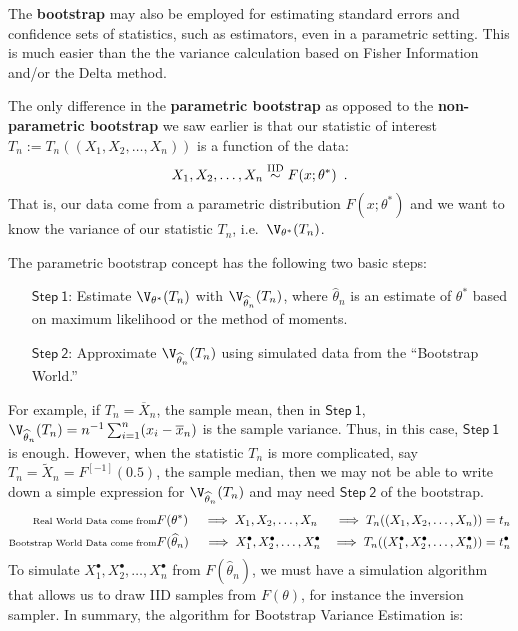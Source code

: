 The {\bf bootstrap} may also be employed for estimating standard errors and confidence sets of statistics, such as estimators, even in a parametric setting.  This is much easier than the the variance calculation based on Fisher Information and/or the Delta method.  

The only difference in the {\bf parametric bootstrap} as opposed to the {\bf non-parametric bootstrap} we saw earlier is that our statistic of interest $T_n := T_n((X_1,X_2,\ldots,X_n))$ is a function of the data: 
$$X_1,X_2,\ldots,X_n \overset{{\rm IID}}{\sim} F(x;\theta^*) \enspace .$$
That is, our data come from a parametric distribution $F(x;\theta^*)$ and we want to know the variance of our statistic $T_n$, i.e.~$\V_{\theta^*}(T_n)$.  

The parametric bootstrap concept has the following two basic steps:
\begin{enumerate}
\item[$\mathsf{Step~1}$:] Estimate $\V_{\theta^*}(T_n)$ with $\V_{\widehat{\theta}_n}(T_n)$, where $\widehat{\theta}_n$ is an estimate of $\theta^*$ based on maximum likelihood or the method of moments.
\item[$\mathsf{Step~2}$:] Approximate $\V_{\widehat{\theta}_n}(T_n)$ using simulated data from the ``Bootstrap World.'' 
\end{enumerate}
For example, if $T_n=\overline{X}_n$, the sample mean, then in $\mathsf{Step~1}$, $\V_{\widehat{\theta}_n}(T_n) = n^{-1} \sum_{i=1}^n (x_i-\overline{x}_n)$ is the sample variance.  Thus, in this case,  $\mathsf{Step~1}$ is enough.  However, when the statistic $T_n$ is more complicated, say $T_n=\widetilde{X}_n = F^{[-1]}(0.5)$, the sample median, then we may not be able to write down a  simple expression for $\V_{\widehat{\theta}_n}(T_n)$ and may need $\mathsf{Step~2}$ of the bootstrap.
\begin{eqnarray}
{\scriptsize \text{Real World Data come from}} &  F(\theta^*) \quad \implies X_1,X_2,\ldots,X_n & \implies 
T_n((X_1,X_2,\ldots,X_n))=t_n \notag \\
{\scriptsize \text{Bootstrap World Data come from}} & F(\widehat{\theta}_n) \quad  \implies X^{\bullet}_1,X^{\bullet}_2,\ldots,X^{\bullet}_n & \implies 
T_n((X^{\bullet}_1,X^{\bullet}_2,\ldots,X^{\bullet}_n))=t^{\bullet}_n \notag
\end{eqnarray}
To simulate $X^{\bullet}_1,X^{\bullet}_2,\ldots,X^{\bullet}_n$ from $F(\widehat{\theta}_n)$, we must have a simulation algorithm that allows us to draw IID samples from $F(\theta)$, for instance the inversion sampler.  In summary, the algorithm for Bootstrap Variance Estimation is:
